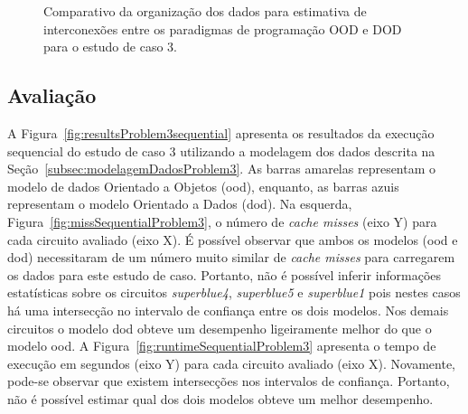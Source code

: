 \begin{figure}[ht]
    \centering
    \hspace{0.1cm}
    \caption[Organização dos dados estudo de caso 3]{Comparativo da organização dos dados para estimativa de interconexões entre os paradigmas de programação OOD e DOD para o estudo de caso 3.}
    \label{fig:problem3ModelagemDados}
\end{figure}


\subsection{Avaliação}

A Figura~\ref{fig:resultsProblem3sequential} apresenta os resultados da execução sequencial do estudo de caso 3 utilizando a modelagem dos dados descrita na Seção~\ref{subsec:modelagemDadosProblem3}. 
As barras amarelas representam o modelo de dados Orientado a Objetos (\ac{ood}), enquanto, as barras azuis representam o modelo Orientado a Dados (\ac{dod}).
Na esquerda, Figura~\ref{fig:missSequentialProblem3}, o número de  \textit{cache misses} (eixo Y) para cada circuito avaliado (eixo X).
É possível observar que ambos os modelos (\ac{ood} e \ac{dod}) necessitaram de um número muito similar de  \textit{cache misses} para carregarem os dados para este estudo de caso.
Portanto, não é possível inferir informações estatísticas sobre os circuitos \textit{superblue4}, \textit{superblue5} e \textit{superblue1} pois nestes casos há uma intersecção no intervalo de confiança entre os dois modelos. Nos demais circuitos o modelo \ac{dod} obteve um desempenho ligeiramente melhor do que o modelo \ac{ood}.
A Figura~\ref{fig:runtimeSequentialProblem3} apresenta o tempo de execução em segundos (eixo Y) para cada circuito avaliado (eixo X).
Novamente, pode-se observar que existem intersecções nos intervalos de confiança.
Portanto, não é possível estimar qual dos dois modelos obteve um melhor desempenho.

